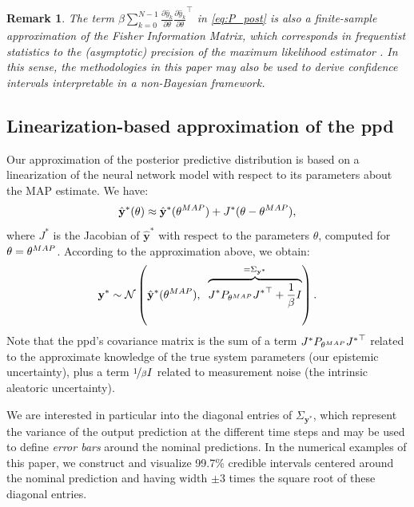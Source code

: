 \documentclass{ifacconf}
\newcommand{\nsamp}{N}
\newcommand{\N}{\mathcal{N}} %
\newcommand{\MAP}{{\rm MAP}}
\newcommand{\tvec}[1]{{\mathbf{#1}}}
\newcommand{\mean}[1]{\hat{#1}}
\newtheorem{remark}{Remark}%
\begin{document}
\begin{remark}
The term $\beta \!\sum_{k=0}^{\nsamp-1} \frac{\partial \mean{y}_k}{\partial \theta} {\frac{\partial \mean{y}_k}{\partial \theta}}^\top$ in \eqref{eq:P_post} is also a finite-sample approximation of the \emph{Fisher Information Matrix}, which corresponds in frequentist statistics to the (asymptotic) precision of the maximum likelihood estimator \citep{van2007parameter}. In this sense, the methodologies in this paper may also be used to derive confidence intervals interpretable in a non-Bayesian framework.
\end{remark}


\subsection{Linearization-based approximation of the ppd}
Our approximation of the posterior predictive distribution is based on a linearization of the neural network model with respect to its parameters about the MAP estimate. We have:
\begin{equation}
 \mean{\tvec{y}}^*(\theta) \approx \mean{\tvec{y}}^*(\theta^{\MAP}) + J^*(\theta - \theta^{\MAP}),%
\end{equation}
where $J^{*}$ is the Jacobian of $\mean{\tvec{y}}^*$ with respect to the parameters $\theta$, computed for $\theta=\theta^{\rm MAP}$.
According to the approximation above, we obtain:
\begin{equation}
\label{eq:ppd_approx}
 \tvec{y}^* \sim \N \left(\mean{\tvec{y}}^*(\theta^{\MAP}),\;\; \overbrace{J^* P_{\theta^{\MAP}} {J^*}^\top  + \frac{1}{\beta} I}^{=\Sigma_{\tvec{y}^*}} \right).
\end{equation}
Note that the ppd's covariance matrix is the sum of a term $J^* P_{\theta^{\MAP}} {J^*}^\top$ related to the approximate knowledge of the true system parameters (our epistemic uncertainty), plus a term $\nicefrac{1}{\beta} I$ related to measurement noise (the intrinsic aleatoric uncertainty). 

We are interested in particular into the diagonal entries of $\Sigma_{\tvec{y}^*}$, which represent the variance of the output prediction at the different time steps and may be used to define \emph{error bars} around the nominal predictions. In the numerical examples of this paper, we construct and visualize 99.7\% credible intervals centered around the nominal prediction and having width $\pm 3$ times the square root of these diagonal entries.
\end{document}
